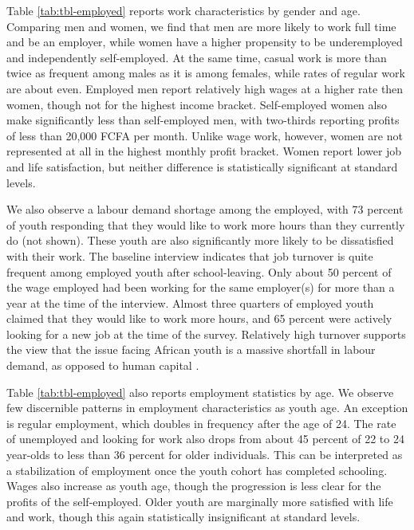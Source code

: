 \documentclass[
  a4paper, twoside, 12pt]{book}
\begin{document}
Table \ref{tab:tbl-employed} reports work characteristics by gender and age. Comparing men and women, we find that men are more likely to work full time and be an employer, while women have a higher propensity to be underemployed and independently self-employed. At the same time, casual work is more than twice as frequent among males as it is among females, while rates of regular work are about even. Employed men report relatively high wages at a higher rate then women, though not for the highest income bracket. Self-employed women also make significantly less than self-employed men, with two-thirds reporting profits of less than 20,000 FCFA per month. Unlike wage work, however, women are not represented at all in the highest monthly profit bracket. Women report lower job and life satisfaction, but neither difference is statistically significant at standard levels.

We also observe a labour demand shortage among the employed, with 73 percent of youth responding that they would like to work more hours than they currently do (not shown). These youth are also significantly more likely to be dissatisfied with their work. The baseline interview indicates that job turnover is quite frequent among employed youth after school-leaving. Only about 50 percent of the wage employed had been working for the same employer(s) for more than a year at the time of the interview. Almost three quarters of employed youth claimed that they would like to work more hours, and 65 percent were actively looking for a new job at the time of the survey. Relatively high turnover supports the view that the issue facing African youth is a massive shortfall in labour demand, as opposed to human capital \autocite{fox2020}.

Table \ref{tab:tbl-employed} also reports employment statistics by age. We observe few discernible patterns in employment characteristics as youth age. An exception is regular employment, which doubles in frequency after the age of 24. The rate of unemployed and looking for work also drops from about 45 percent of 22 to 24 year-olds to less than 36 percent for older individuals. This can be interpreted as a stabilization of employment once the youth cohort has completed schooling. Wages also increase as youth age, though the progression is less clear for the profits of the self-employed. Older youth are marginally more satisfied with life and work, though this again statistically insignificant at standard levels.
\end{document}
